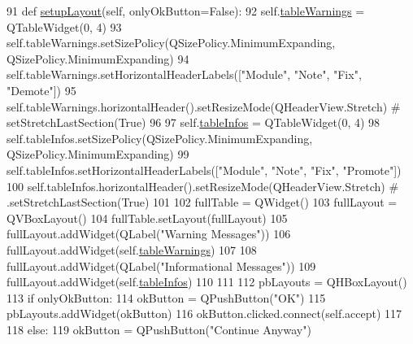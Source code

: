 \begin{DoxyCode}
91     \textcolor{keyword}{def }\hyperlink{classsoftware_1_1chipwhisperer_1_1common_1_1ui_1_1ValidationDialog_1_1ValidationDialog_a6c01e4980506a33e3e870324d948ae40}{setupLayout}(self, onlyOkButton=False):
92         self.\hyperlink{classsoftware_1_1chipwhisperer_1_1common_1_1ui_1_1ValidationDialog_1_1ValidationDialog_a3f6ce8711d336349a1969276ba025951}{tableWarnings} = QTableWidget(0, 4)
93         self.tableWarnings.setSizePolicy(QSizePolicy.MinimumExpanding, QSizePolicy.MinimumExpanding)
94         self.tableWarnings.setHorizontalHeaderLabels([\textcolor{stringliteral}{"Module"}, \textcolor{stringliteral}{"Note"}, \textcolor{stringliteral}{"Fix"}, \textcolor{stringliteral}{"Demote"}])
95         self.tableWarnings.horizontalHeader().setResizeMode(QHeaderView.Stretch)  \textcolor{comment}{#
       setStretchLastSection(True)}
96 
97         self.\hyperlink{classsoftware_1_1chipwhisperer_1_1common_1_1ui_1_1ValidationDialog_1_1ValidationDialog_a1b95a93215b90d97b977c59cbb371856}{tableInfos} = QTableWidget(0, 4)
98         self.tableInfos.setSizePolicy(QSizePolicy.MinimumExpanding, QSizePolicy.MinimumExpanding)
99         self.tableInfos.setHorizontalHeaderLabels([\textcolor{stringliteral}{"Module"}, \textcolor{stringliteral}{"Note"}, \textcolor{stringliteral}{"Fix"}, \textcolor{stringliteral}{"Promote"}])
100         self.tableInfos.horizontalHeader().setResizeMode(QHeaderView.Stretch)  \textcolor{comment}{#
       .setStretchLastSection(True)}
101 
102         fullTable = QWidget()
103         fullLayout = QVBoxLayout()
104         fullTable.setLayout(fullLayout)
105         fullLayout.addWidget(QLabel(\textcolor{stringliteral}{"Warning Messages"}))
106         fullLayout.addWidget(self.\hyperlink{classsoftware_1_1chipwhisperer_1_1common_1_1ui_1_1ValidationDialog_1_1ValidationDialog_a3f6ce8711d336349a1969276ba025951}{tableWarnings})
107 
108         fullLayout.addWidget(QLabel(\textcolor{stringliteral}{"Informational Messages"}))
109         fullLayout.addWidget(self.\hyperlink{classsoftware_1_1chipwhisperer_1_1common_1_1ui_1_1ValidationDialog_1_1ValidationDialog_a1b95a93215b90d97b977c59cbb371856}{tableInfos})
110 
111 
112         pbLayouts = QHBoxLayout()
113         \textcolor{keywordflow}{if} onlyOkButton:
114             okButton = QPushButton(\textcolor{stringliteral}{"OK"})
115             pbLayouts.addWidget(okButton)
116             okButton.clicked.connect(self.accept)
117 
118         \textcolor{keywordflow}{else}:
119             okButton = QPushButton(\textcolor{stringliteral}{"Continue Anyway"})

\end{DoxyCode}
